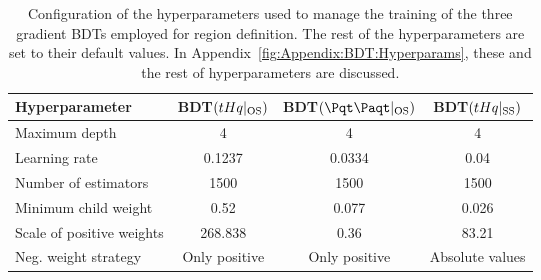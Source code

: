 \begin{table}[h]
\centering
\begin{tabular}{l|c|c|c}
\toprule
Hyperparameter       & BDT$(tHq|_{\text{OS}})$ & BDT$(\ttbar|_{\text{OS}})$ & BDT$(tHq|_{\text{SS}})$ \\ \midrule
Maximum depth             & 4       & 4      & 4     \\ 
Learning rate             & 0.1237  & 0.0334 & 0.04  \\
Number of estimators      & 1500    & 1500   & 1500  \\
Minimum child weight       & 0.52    & 0.077  & 0.026 \\
Scale of positive weights & 268.838 & 0.36   & 83.21 \\
Neg. weight strategy & Only positive            & Only positive              & Absolute values      \\ \bottomrule   
\end{tabular}
\caption{Configuration of the hyperparameters used to manage the training of the three gradient BDTs employed for region definition.
The rest of the hyperparameters are set to their default values. In Appendix~\ref{fig:Appendix:BDT:Hyperparams}, these and the rest of
hyperparameters are discussed.}
\label{tab:ChaptH:EventSelection:BDT:Hyperparameters}
\end{table}




